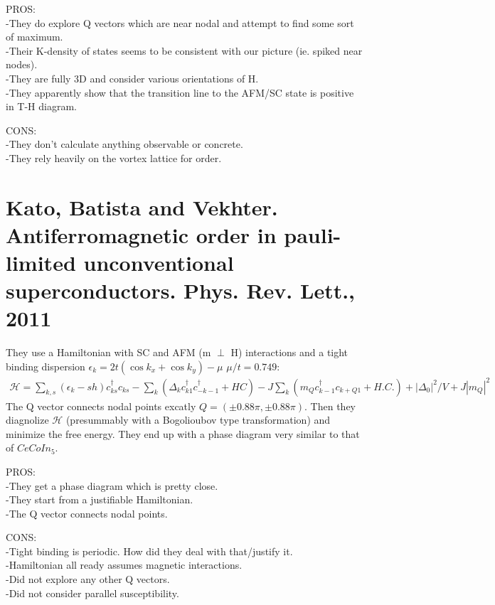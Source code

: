 \documentclass{article}
\begin{document}
PROS: \\
-They do explore Q vectors which are near nodal and attempt to find some sort of maximum. \\
-Their K-density of states seems to be consistent with our picture (ie. spiked near nodes). \\
-They are fully 3D and consider various orientations of H. \\ 
-They apparently show that the transition line to the AFM/SC state is positive in T-H diagram.

CONS: \\
-They don't calculate anything observable or concrete. \\
-They rely heavily on the vortex lattice for order. \\



\section{Kato, Batista and Vekhter. Antiferromagnetic order in pauli-limited unconventional superconductors. Phys. Rev. Lett., 2011}
They use a Hamiltonian with SC and AFM (m $\perp$ H) interactions and a tight binding dispersion $\epsilon_k=2t(\cos k_x +\cos k_y)-\mu$ $\mu/t=0.749$:
\begin{align*}
\mathcal{H}=\sum\limits_{k,s} (\epsilon_k-sh)c^\dagger_{ks} c_{ks}-\sum\limits_{k} (\Delta_k c^\dagger_{k1}c^\dagger_{-k-1}+HC)-J\sum\limits_k (m_Q c^\dagger_{k-1}c_{k+Q 1}+H.C.)+|\Delta_0|^2/V+J|m_Q|^2
\end{align*}
The Q vector connects nodal points excatly $Q=(\pm0.88\pi,\pm 0.88\pi)$. Then they diagnolize $\mathcal{H}$ (presummably with a Bogolioubov type transformation) and minimize the free energy. They end up with a phase diagram very similar to that of $CeCoIn_5$.

PROS: \\
-They get a phase diagram which is pretty close. \\
-They start from a justifiable Hamiltonian. \\
-The Q vector connects nodal points.

CONS: \\
-Tight binding is periodic. How did they deal with that/justify it. \\
-Hamiltonian all ready assumes magnetic interactions. \\
-Did not explore any other Q vectors. \\
-Did not consider parallel susceptibility. \\
\end{document}
